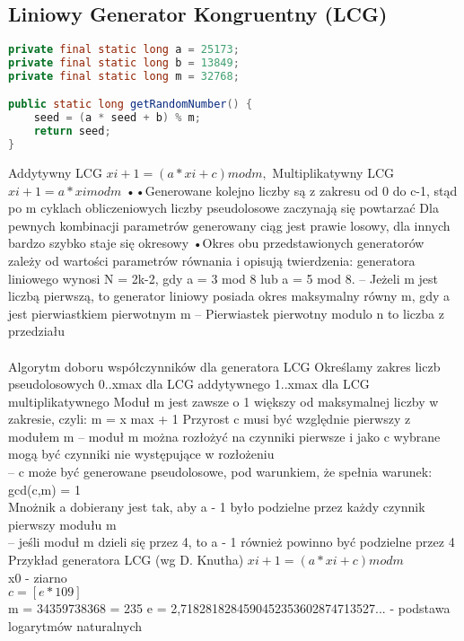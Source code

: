 \documentclass[a4paper, 11pt]{article} %
\begin{document}
\subsection{Liniowy Generator Kongruentny (LCG)}
\begin{lstlisting}[style=mystyle, language=java, frame=single, caption = Generowanie następnej liczby pseudolosowej przez LCG]
private final static long a = 25173;
private final static long b = 13849;
private final static long m = 32768;

public static long getRandomNumber() {
    seed = (a * seed + b) % m;
    return seed;
}
\end{lstlisting}
Addytywny LCG
$xi+1=(a*xi+c) mod m,$
Multiplikatywny LCG
$xi+1 = a * x i mod m$
••Generowane kolejno liczby są z zakresu od 0 do
c-1, stąd po m cyklach obliczeniowych liczby
pseudolosowe zaczynają się powtarzać
Dla pewnych kombinacji parametrów
generowany ciąg jest prawie losowy, dla innych
bardzo szybko staje się okresowy
•Okres obu przedstawionych generatorów zależy
od wartości parametrów równania i opisują
twierdzenia:
generatora liniowego wynosi N = 2k-2, gdy a = 3 mod
8 lub a = 5 mod 8.
– Jeżeli m jest liczbą pierwszą, to generator liniowy
posiada okres maksymalny równy m, gdy a jest pierwiastkiem pierwotnym m
– Pierwiastek pierwotny modulo n to liczba z przedziału
\\ \\Algorytm doboru współczynników dla generatora LCG
Określamy zakres liczb pseudolosowych
0..xmax dla LCG addytywnego
1..xmax dla LCG multiplikatywnego
Moduł m jest zawsze o 1 większy od maksymalnej liczby
w zakresie, czyli:
m = x max + 1
Przyrost c musi być względnie pierwszy z modułem m
– moduł m można rozłożyć na czynniki pierwsze i jako c wybrane mogą być czynniki nie występujące w rozłożeniu\\
– c może być generowane pseudolosowe, pod warunkiem, że spełnia warunek: gcd(c,m) = 1\\
Mnożnik a dobierany jest tak, aby a - 1 było podzielne przez każdy czynnik pierwszy modułu m\\
– jeśli moduł m dzieli się przez 4, to a - 1 również powinno być podzielne przez 4\\
Przykład generatora LCG (wg D. Knutha)
$xi+1=(a*xi+c) mod m$\\
x0 - ziarno \\
$c=[e*109]$\\
m = 34359738368 = 235
e = 2,7182818284590452353602874713527...
- podstawa logarytmów naturalnych
\end{document}
